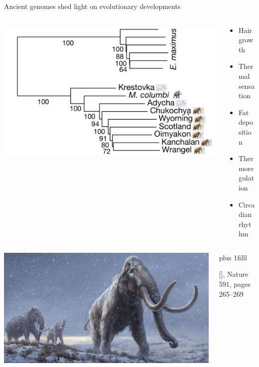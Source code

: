 \documentclass[10pt]{beamer}
\newcommand{\credit}[1]{{\vskip0pt plus 1filll \par \raggedleft \scriptsize \mdseries \color{mDarkBrown} #1 \par}}
\newcommand{\citeme}[1]{{\xspace\color{scAqua} \scriptsize [\cite{#1}]}}
\begin{document}
\begin{frame}{Ancient genomes shed light on evolutionary developments}
\begin{columns}
	\begin{column}{0.65\textwidth}
		\begin{center}
			\includegraphics[width=\textwidth]{./figures/mammoth_tree.png}
		\end{center}
	\end{column}
	\begin{column}{0.35\textwidth}
		\begin{itemize}
			\item Hair growth
			\item Thermal sensation
			\item Fat deposition
			\item Thermoregulation
			\item Circadian rhythm
		\end{itemize}
	\end{column}
\end{columns}
\begin{columns}
	\begin{column}{0.5\textwidth}
		\begin{center}
			\includegraphics[width=\textwidth]{./figures/mammoth.png}
	\end{center}\end{column}
	\begin{column}{0.5\textwidth}
		\vspace{3cm} 
		\credit{\citeme{Valk2021}, Nature 591, pages 265–269}
	\end{column}
\end{columns}
\end{frame}
\end{document}
